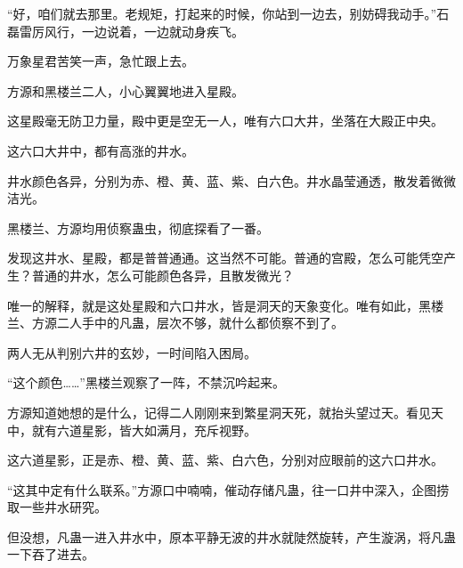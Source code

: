 \begin{this_body}
“好，咱们就去那里。老规矩，打起来的时候，你站到一边去，别妨碍我动手。”石磊雷厉风行，一边说着，一边就动身疾飞。

万象星君苦笑一声，急忙跟上去。

方源和黑楼兰二人，小心翼翼地进入星殿。

这星殿毫无防卫力量，殿中更是空无一人，唯有六口大井，坐落在大殿正中央。

这六口大井中，都有高涨的井水。

井水颜色各异，分别为赤、橙、黄、蓝、紫、白六色。井水晶莹通透，散发着微微洁光。

黑楼兰、方源均用侦察蛊虫，彻底探看了一番。

发现这井水、星殿，都是普普通通。这当然不可能。普通的宫殿，怎么可能凭空产生？普通的井水，怎么可能颜色各异，且散发微光？

唯一的解释，就是这处星殿和六口井水，皆是洞天的天象变化。唯有如此，黑楼兰、方源二人手中的凡蛊，层次不够，就什么都侦察不到了。

两人无从判别六井的玄妙，一时间陷入困局。

“这个颜色……”黑楼兰观察了一阵，不禁沉吟起来。

方源知道她想的是什么，记得二人刚刚来到繁星洞天死，就抬头望过天。看见天中，就有六道星影，皆大如满月，充斥视野。

这六道星影，正是赤、橙、黄、蓝、紫、白六色，分别对应眼前的这六口井水。

“这其中定有什么联系。”方源口中喃喃，催动存储凡蛊，往一口井中深入，企图捞取一些井水研究。

但没想，凡蛊一进入井水中，原本平静无波的井水就陡然旋转，产生漩涡，将凡蛊一下吞了进去。

\end{this_body}

